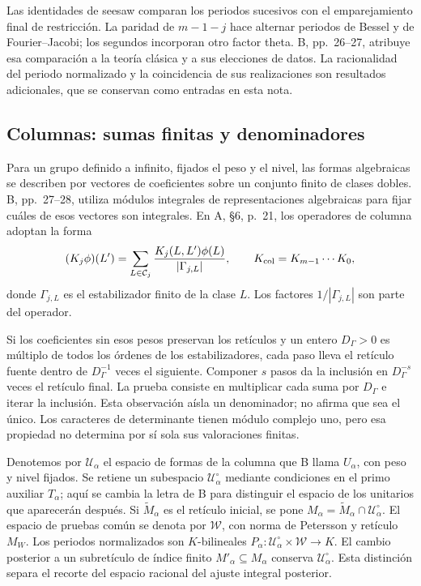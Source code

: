Las identidades de seesaw comparan los periodos sucesivos con el
emparejamiento final de restricción. La paridad de $m-1-j$ hace alternar
periodos de Bessel y de Fourier--Jacobi; los segundos incorporan otro
factor theta. B, pp.~26--27, atribuye esa comparación a la teoría
clásica y a sus elecciones de datos. La racionalidad del periodo
normalizado y la coincidencia de sus realizaciones son resultados
adicionales, que se conservan como entradas en esta nota.

\subsection{Columnas: sumas finitas y denominadores}

Para un grupo definido a infinito, fijados el peso y el nivel, las
formas algebraicas se describen por vectores de coeficientes sobre un
conjunto finito de clases dobles. B, pp.~27--28, utiliza módulos
integrales de representaciones algebraicas para fijar cuáles de esos
vectores son integrales. En A, §6, p.~21, los operadores de columna adoptan
la forma
\begin{equation}
 (K_j\phi)(L')=\sum_{L\in\mathcal C_j}
       \frac{K_j(L,L')\phi(L)}{|\Gamma_{j,L}|},
 \qquad K_{\rm col}=K_{m-1}\cdots K_0,
 \label{eq:periodos-kernel}
\end{equation}
donde $\Gamma_{j,L}$ es el estabilizador finito de la clase $L$.
Los factores $1/|\Gamma_{j,L}|$ son parte del operador.

Si los coeficientes sin esos pesos preservan los retículos y un entero
$D_\Gamma>0$ es múltiplo de todos los órdenes de los estabilizadores,
cada paso lleva el retículo fuente dentro de $D_\Gamma^{-1}$ veces
el siguiente. Componer $s$ pasos da la inclusión en
$D_\Gamma^{-s}$ veces el retículo final. La prueba consiste en
multiplicar cada suma por $D_\Gamma$ e iterar la inclusión.
Esta observación aísla un denominador; no afirma que sea el único.
Los caracteres de determinante tienen módulo complejo uno, pero esa
propiedad no determina por sí sola sus valoraciones finitas.

Denotemos por $\mathcal U_\alpha$ el espacio de formas de la columna
que B llama $U_\alpha$, con peso y nivel fijados. Se retiene un subespacio
$\mathcal U_\alpha^\circ$ mediante condiciones en el primo auxiliar
$T_\alpha$; aquí se cambia la letra de B para distinguir el espacio
de los unitarios que aparecerán después. Si $\widetilde M_\alpha$
es el retículo inicial, se pone
$M_\alpha=\widetilde M_\alpha\cap\mathcal U_\alpha^\circ$.
El espacio de pruebas común se denota por $\mathcal W$, con norma
de Petersson y retículo $M_W$. Los periodos normalizados son
$K$-bilineales
$P_\alpha:\mathcal U_\alpha^\circ\times\mathcal W\to K$.
El cambio posterior a un subretículo de índice finito
$M'_\alpha\subseteq M_\alpha$ conserva
$\mathcal U_\alpha^\circ$. Esta distinción separa el recorte del
espacio racional del ajuste integral posterior.

